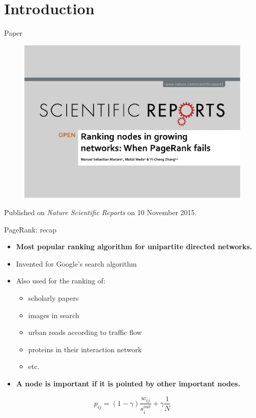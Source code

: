 \section{Introduction}
\begin{frame}{Paper}
    \begin{figure}
        \includegraphics[width=1.0\textwidth]{figures/Header}
    \end{figure}

    Published on \emph{Nature Scientific Reports} on 10 November 2015.
\end{frame}

\begin{frame}{PageRank: recap}
    \begin{itemize}
        \item \textbf{Most popular ranking algorithm for unipartite directed networks.}
        \item Invented for Google's search algorithm
        \item Also used for the ranking of:
        \begin{itemize}
            \item scholarly papers
            \item images in search
            \item urban roads according to traffic flow
            \item proteins in their interaction network
            \item etc.
        \end{itemize}
        \item \textbf{A node is important if it is pointed by other important nodes.}
    \end{itemize}
    \[
        p_{ij} = (1-\gamma) \frac{w_{ij}}{s_i^{out}} + \gamma \frac{1}{N}
    \]
\end{frame}

